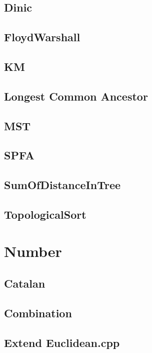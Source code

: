 \subsection{Dinic}

\subsection{FloydWarshall}

\subsection{KM}

\subsection{Longest Common Ancestor}

\subsection{MST}

\subsection{SPFA}

\subsection{SumOfDistanceInTree}

\subsection{TopologicalSort}


\section{Number}

\subsection{Catalan}

\subsection{Combination}

\subsection{Extend Euclidean.cpp}

